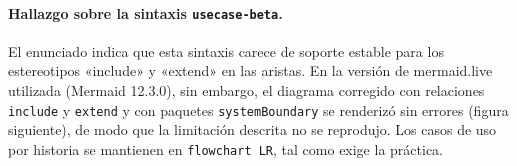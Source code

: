 \paragraph{Hallazgo sobre la sintaxis \texttt{usecase-beta}.} El enunciado indica que esta sintaxis carece de soporte estable para los estereotipos «include» y «extend» en las aristas. En la versión de mermaid.live utilizada (Mermaid 12.3.0), sin embargo, el diagrama corregido con relaciones \texttt{include} y \texttt{extend} y con paquetes \texttt{systemBoundary} se renderizó sin errores (figura siguiente), de modo que la limitación descrita no se reprodujo. Los casos de uso por historia se mantienen en \texttt{flowchart LR}, tal como exige la práctica.
